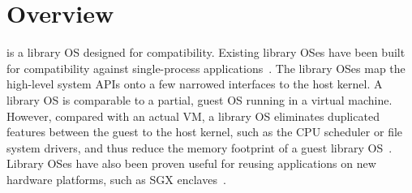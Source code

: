 \section{\graphene{} Overview}
\label{sec:overview:libos}

\graphene{} is a library OS designed for compatibility.
Existing library OSes have been built for compatibility against single-process applications~\cite{porter11drawbridge}. The library OSes map the high-level system APIs onto a few narrowed interfaces to the host kernel. %
A library OS is comparable to a partial, guest OS running in a virtual machine.
However, compared with an actual VM, a library OS eliminates duplicated features between the guest to the host kernel, such as the CPU scheduler or file system drivers, and thus reduce the memory footprint of a guest library OS~\cite{porter11drawbridge,unikernels}.
Library OSes have also been proven useful for reusing applications on new hardware platforms, such as SGX enclaves~\cite{baumann14haven}.




